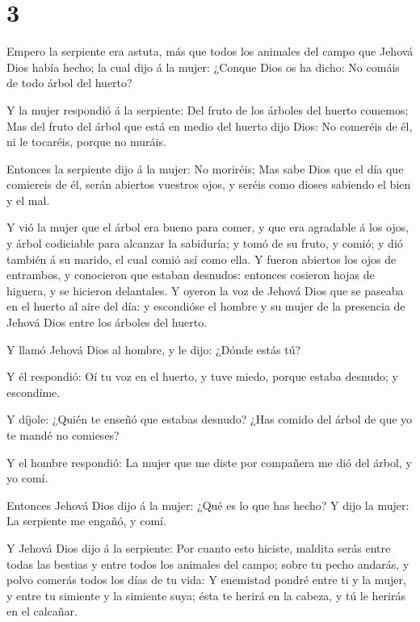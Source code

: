 \hypertarget{section-2}{%
\section{3}\label{section-2}}

 Empero la serpiente era astuta, más que todos los animales
del campo que Jehová Dios había hecho; la cual dijo á la mujer: ¿Conque
Dios os ha dicho: No comáis de todo árbol del huerto?

 Y la mujer respondió á la serpiente: Del fruto de los
árboles del huerto comemos;  Mas del fruto del árbol que
está en medio del huerto dijo Dios: No comeréis de él, ni le tocaréis,
porque no muráis.

 Entonces la serpiente dijo á la mujer: No moriréis;
 Mas sabe Dios que el día que comiereis de él, serán
abiertos vuestros ojos, y seréis como dioses sabiendo el bien y el mal.

 Y vió la mujer que el árbol era bueno para comer, y que era
agradable á los ojos, y árbol codiciable para alcanzar la sabiduría; y
tomó de su fruto, y comió; y dió también á su marido, el cual comió así
como ella.  Y fueron abiertos los ojos de entrambos, y
conocieron que estaban desnudos: entonces cosieron hojas de higuera, y
se hicieron delantales.  Y oyeron la voz de Jehová Dios que
se paseaba en el huerto al aire del día: y escondióse el hombre y su
mujer de la presencia de Jehová Dios entre los árboles del huerto.

 Y llamó Jehová Dios al hombre, y le dijo: ¿Dónde estás tú?

 Y él respondió: Oí tu voz en el huerto, y tuve miedo,
porque estaba desnudo; y escondíme.

 Y díjole: ¿Quién te enseñó que estabas desnudo? ¿Has
comido del árbol de que yo te mandé no comieses?

 Y el hombre respondió: La mujer que me diste por compañera
me dió del árbol, y yo comí.

 Entonces Jehová Dios dijo á la mujer: ¿Qué es lo que has
hecho? Y dijo la mujer: La serpiente me engañó, y comí.

 Y Jehová Dios dijo á la serpiente: Por cuanto esto
hiciste, maldita serás entre todas las bestias y entre todos los
animales del campo; sobre tu pecho andarás, y polvo comerás todos los
días de tu vida:  Y enemistad pondré entre ti y la mujer, y
entre tu simiente y la simiente suya; ésta te herirá en la cabeza, y tú
le herirás en el calcañar.

